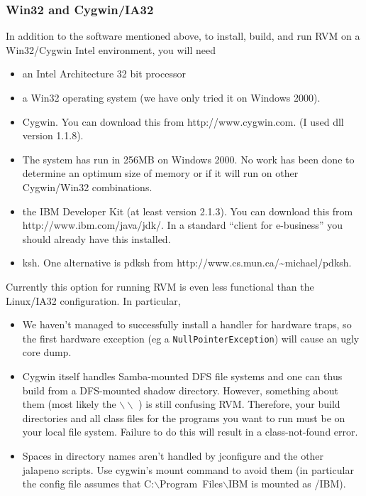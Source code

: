 \subsubsection{Win32 and Cygwin/IA32}
In addition to the software mentioned above, to install, build, and
run RVM on a Win32/Cygwin Intel environment, you will need 
\begin{itemize}
\item an Intel Architecture 32 bit processor
\item a Win32 operating system (we have only tried it on Windows 2000).
\item Cygwin. You can download this from 
           {http://www.cygwin.com}. (I used dll version 1.1.8).
\item The system has run in 256MB on Windows 2000. No work has been
done to determine an optimum size of memory or if it will run on other
Cygwin/Win32 combinations.
\item the IBM Developer Kit (at least version 2.1.3).  You can download this from
           {http://www.ibm.com/java/jdk/}.
In a standard ``client for e-business'' you should already have this
installed.
\item ksh.  One alternative is pdksh from 
       {http://www.cs.mun.ca/\~{}michael/pdksh}.
\end{itemize}
Currently this option for running RVM is even less functional than
the Linux/IA32 configuration. In particular,
\begin{itemize}
\item We haven't managed to successfully install a handler for hardware traps,
so the first hardware exception (eg a {\tt NullPointerException}) will cause
an ugly core dump.
\item Cygwin itself handles Samba-mounted DFS file
systems and one can thus build from a DFS-mounted shadow
directory. However, something about them (most likely the 
$\backslash\backslash$ ) is
still confusing RVM.  Therefore, your build directories and all class
files for the programs you want to run must be on your local file
system. Failure to do this will result in a class-not-found error.
\item Spaces in directory names aren't handled by jconfigure and the
other jalapeno scripts.  Use cygwin's mount command to avoid them (in
particular the config file assumes that
C:$\backslash$Program~Files$\backslash$IBM is mounted as /IBM).
\end{itemize}


